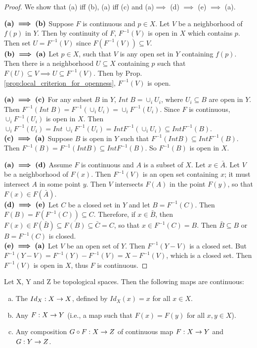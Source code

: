\documentclass[11pt,a4paper]{article}
\begin{document}
\begin{proof}
    We show that (a) iff (b), (a) iff (c) and (a)$\implies$ (d) $\implies$ (e) $\implies$ (a).

    \noindent $\textbf{(a)}\boldsymbol{\implies}\textbf{(b)}$ Suppose $F$ is continuous and $p\in X$. Let $V$ be a neighborhood of $f(p)$ in $Y$. Then by continuity of $F$, $F^{-1}(V)$ is open in $X$ which contains $p$. Then set $U = F^{-1}(V)$ since $F(F^{-1}(V))\subseteq V$. \\
    $\textbf{(b)}\boldsymbol{\implies}\textbf{(a)}$ Let $p\in X$, such that $V$ is any open set in $Y$ containing $f(p)$. Then there is a neighborhood $U\subseteq X$ containing $p$ such that $F(U)\subseteq V\implies U\subseteq F^{-1}(V)$. Then by Prop. \ref{prop:local_criterion_for_openness}, $F^{-1}(V)$ is open. 
    
    \noindent $\textbf{(a)}\boldsymbol{\implies}\textbf{(c)}$ For any subset $B$ in $Y$, $Int\;B = \cup_i U_i$, where $U_i\subseteq B$ are open in $Y$. Then $F^{-1}(Int\;B) = F^{-1}(\cup_i U_i) = \cup_i F^{-1}(U_i)$. Since $F$ is continuous, $\cup_i F^{-1}(U_i)$ is open in $X$. Then $\cup_i F^{-1}(U_i) = Int\;\cup_i F^{-1}(U_i) = Int F^{-1}(\cup_i U_i) \subseteq Int F^{-1}(B)$.\\
    $\textbf{(c)}\boldsymbol{\implies}\textbf{(a)}$ Suppose $B$ is open in $Y$ such that $F^{-1}(Int B)\subseteq Int F^{-1}(B)$. Then $F^{-1}(B) = F^{-1}(Int B)\subseteq Int F^{-1}(B)$. So $F^{-1}(B)$ is open in $X$.
    
    \noindent $\textbf{(a)}\boldsymbol{\implies}\textbf{(d)}$ Assume $F$ is continuous and $A$ is a subset of $X$. Let $x\in \bar{A}$. Let $V$ be a neighborhood of $F(x)$. Then $F^{-1}(V)$ is an open set containing $x$; it must intersect $A$ in some point $y$. Then $V$ intersects $F(A)$ in the point $F(y)$, so that $F(x)\in F(\bar{A})$.\\
    $\textbf{(d)}\boldsymbol{\implies}\textbf{(e)}$ Let $C$ be a closed set in $Y$ and let $B = F^{-1}(C)$. Then $F(B) = F(F^{-1}(C))\subseteq C.$ Therefore, if $x\in \bar{B}$, then $F(x)\in F(\bar{B})\subseteq \overline{F(B)}\subseteq \bar{C} = C$, so that $x\in F^{-1}(C) = B$. Then $\bar{B}\subseteq B$ or $B = F^{-1}(C)$ is closed.\\
    $\textbf{(e)}\boldsymbol{\implies}\textbf{(a)}$ Let $V$ be an open set of $Y$. Then $F^{-1}(Y-V)$ is a closed set. But $F^{-1}(Y - V) = F^{-1}(Y) - F^{-1}(V) = X - F^{-1}(V)$, which is a closed set. Then $F^{-1}(V)$ is open in $X$, thus $F$ is continuous.
\end{proof}

\begin{proposition}
    Let X, Y and Z be topological spaces. Then the following maps are continuous:
    \begin{enumerate}[(a)]
        \item The  $Id_X:X\rightarrow X$, defined by $Id_X(x)=x$ for all $x\in X$.
        \item Any  $F:X\rightarrow Y$ (i.e., a map such that $F(x)=F(y)$ for all $x,y\in X$).
        \item Any composition $G\circ F:X\rightarrow Z$ of continuous map $F:X\rightarrow Y$ and $G:Y\rightarrow Z$.
    \end{enumerate}
\end{proposition}
\end{document}
